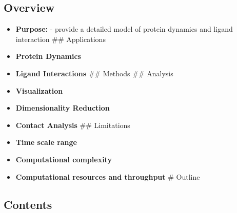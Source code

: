 \hypertarget{overview-4}{%
\subsection{Overview}\label{overview-4}}

\begin{itemize}
\tightlist
\item
  \textbf{Purpose:} - provide a detailed model of protein dynamics and
  ligand interaction \#\# Applications
\item
  \textbf{Protein Dynamics}
\item
  \textbf{Ligand Interactions} \#\# Methods \#\# Analysis
\item
  \textbf{Visualization}
\item
  \textbf{Dimensionality Reduction}
\item
  \textbf{Contact Analysis} \#\# Limitations
\item
  \textbf{Time scale range}
\item
  \textbf{Computational complexity}
\item
  \textbf{Computational resources and throughput} \# Outline
\end{itemize}

\hypertarget{contents-12}{%
\subsection{Contents}\label{contents-12}}

